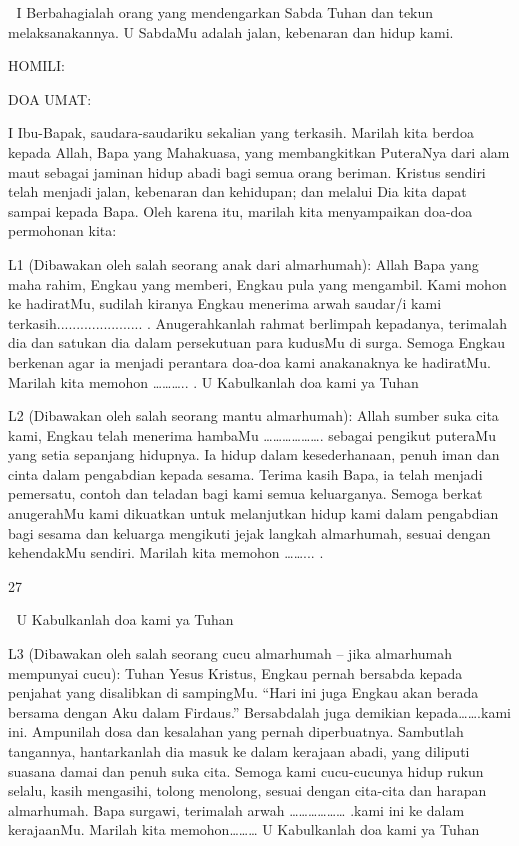 \documentclass[10pt,a5paper,fancyhdr]{memoir}
\begin{document}

I Berbahagialah orang yang mendengarkan Sabda Tuhan dan 
tekun melaksanakannya. 
U SabdaMu adalah jalan, kebenaran dan hidup kami. 


HOMILI: 


DOA UMAT: 


I Ibu-Bapak, saudara-saudariku sekalian yang terkasih. Marilah 
kita berdoa kepada Allah, Bapa yang Mahakuasa, yang 
membangkitkan PuteraNya dari alam maut sebagai jaminan hidup 
abadi bagi semua orang beriman. Kristus sendiri telah menjadi jalan, 
kebenaran dan kehidupan; dan melalui Dia kita dapat sampai kepada 
Bapa. Oleh karena itu, marilah kita menyampaikan doa-doa 
permohonan kita: 


L1 (Dibawakan oleh salah seorang anak dari almarhumah): Allah 
Bapa yang maha rahim, Engkau yang memberi, Engkau pula yang 
mengambil. Kami mohon ke hadiratMu, sudilah kiranya Engkau 
menerima arwah saudar/i kami terkasih......................
. 
Anugerahkanlah rahmat berlimpah kepadanya, terimalah dia dan 
satukan dia dalam persekutuan para kudusMu di surga. Semoga 
Engkau berkenan agar ia menjadi perantara doa-doa kami anakanaknya 
ke hadiratMu. Marilah kita memohon ………..
. 
U Kabulkanlah doa kami ya Tuhan 


L2 (Dibawakan oleh salah seorang mantu almarhumah): Allah 
sumber suka cita kami, Engkau telah menerima hambaMu 
………………. sebagai pengikut puteraMu yang setia sepanjang 
hidupnya. Ia hidup dalam kesederhanaan, penuh iman dan cinta 
dalam pengabdian kepada sesama. Terima kasih Bapa, ia telah 
menjadi pemersatu, contoh dan teladan bagi kami semua 
keluarganya. Semoga berkat anugerahMu kami dikuatkan untuk 
melanjutkan hidup kami dalam pengabdian bagi sesama dan keluarga 
mengikuti jejak langkah almarhumah, sesuai dengan kehendakMu 
sendiri. Marilah kita memohon ……...
. 


27 



U Kabulkanlah doa kami ya Tuhan 


L3 (Dibawakan oleh salah seorang cucu almarhumah – jika 
almarhumah mempunyai cucu): Tuhan Yesus Kristus, Engkau pernah 
bersabda kepada penjahat yang disalibkan di sampingMu. “Hari ini 
juga Engkau akan berada bersama dengan Aku dalam Firdaus.” 
Bersabdalah juga demikian kepada…….kami ini. Ampunilah dosa 
dan kesalahan yang pernah diperbuatnya. Sambutlah tangannya, 
hantarkanlah dia masuk ke dalam kerajaan abadi, yang diliputi 
suasana damai dan penuh suka cita. Semoga kami cucu-cucunya 
hidup rukun selalu, kasih mengasihi, tolong menolong, sesuai dengan 
cita-cita dan harapan almarhumah. Bapa surgawi, terimalah arwah 
……………… .kami ini ke dalam kerajaanMu. Marilah kita 
memohon……… 
U Kabulkanlah doa kami ya Tuhan 
\end{document}
